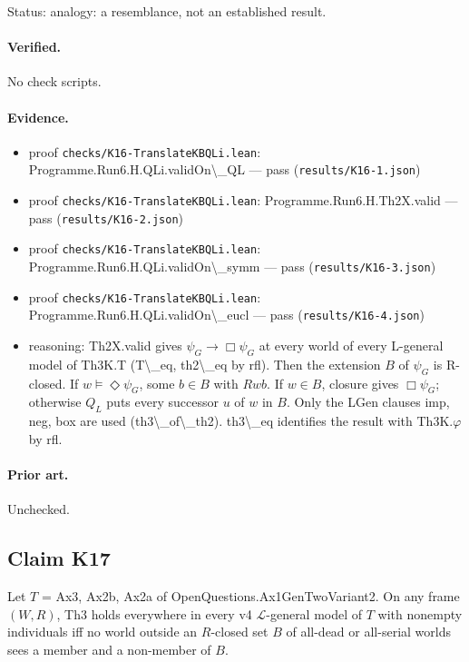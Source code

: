 \documentclass{article}
\begin{document}
Status: analogy: a resemblance, not an established result.

\paragraph{Verified.}
No check scripts.

\paragraph{Evidence.}
\begin{itemize}
\item proof \texttt{checks/K16-TranslateKBQLi.lean}: Programme.Run6.H.QLi.validOn\textbackslash{}\_QL --- pass (\texttt{results/K16-1.json})
\item proof \texttt{checks/K16-TranslateKBQLi.lean}: Programme.Run6.H.Th2X.valid --- pass (\texttt{results/K16-2.json})
\item proof \texttt{checks/K16-TranslateKBQLi.lean}: Programme.Run6.H.QLi.validOn\textbackslash{}\_symm --- pass (\texttt{results/K16-3.json})
\item proof \texttt{checks/K16-TranslateKBQLi.lean}: Programme.Run6.H.QLi.validOn\textbackslash{}\_eucl --- pass (\texttt{results/K16-4.json})
\item reasoning: Th2X.valid gives $\psi_G\to\Box\psi_G$ at every world of every L-general model of Th3K.T (T\textbackslash{}\_eq, th2\textbackslash{}\_eq by rfl). Then the extension $B$ of $\psi_G$ is R-closed. If $w\models\Diamond\psi_G$, some $b\in B$ with $Rwb$. If $w\in B$, closure gives $\Box\psi_G$; otherwise $Q_L$ puts every successor $u$ of $w$ in $B$. Only the LGen clauses imp, neg, box are used (th3\textbackslash{}\_of\textbackslash{}\_th2). th3\textbackslash{}\_eq identifies the result with Th3K.$\varphi$ by rfl.
\end{itemize}

\paragraph{Prior art.} Unchecked.

\subsection*{Claim K17}

Let $T$ = Ax3, Ax2b, Ax2a of OpenQuestions.Ax1GenTwoVariant2. On any frame $(W,R)$, Th3 holds everywhere in every v4 $\mathcal L$-general model of $T$ with nonempty individuals iff no world outside an $R$-closed set $B$ of all-dead or all-serial worlds sees a member and a non-member of $B$.
\end{document}
